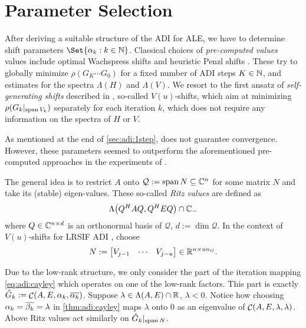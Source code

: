 \section{Parameter Selection}
\label{sec:adi:parameters}

After deriving a suitable structure of the \ac{ADI} for \ac{ALE},
we have to determine shift parameters $\Set{\alpha_k : k\in\N}$.
Classical choices of \emph{pre-computed values} values include
optimal Wachspress shifts \cite{Wachspress1992,Wachspress2013} and
heuristic Penzl shifts \cite{Penzl1999}.
These try to globally minimize $\rho(G_K \cdots G_0)$ for a fixed number of \ac{ADI} steps $K\in\mathbb{N}$,
and estimates for the spectra $\Lambda(H)$ and $\Lambda(V)$.
We resort to the first ansatz of \emph{self-generating shifts} described in \cite[Section~5.3]{Kuerschner2016},
so-called $V(u)$-shifts,
which aim at minimizing
$\rho(G_k |_{\operatorname{span} V_k})$
separately for each iteration $k$,
which does not require any information on the spectra of $H$ or $V$.

As mentioned at the end of \autoref{sec:adi:1step},
does not guarantee convergence.
However, these parameters seemed to outperform the aforementioned pre-computed approaches in the experiments of \cite{Kuerschner2016}.

The general idea is to restrict $A$ onto
$\mathcal Q := \operatorname{span} N \subseteq \mathbb{C}^n$
for some matrix $N$ and take its (stable) eigen-values.
These so-called \emph{Ritz values} are defined as
\begin{equation}
  \Lambda\big( Q^H A Q, Q^H E Q \big) \cap \mathbb{C}_-
\end{equation}
where $Q\in\mathbb{C}^{n\times d}$ is an orthonormal basis of $\mathcal Q$, $d := \dim\mathcal Q$.
In the context of $V(u)$-shifts for \ac{LRSIF} \ac{ADI} \cite{Lang2015}, choose
\begin{equation}
  N := \begin{bmatrix}
    V_{j-1} &
    \cdots &
    V_{j-u}
  \end{bmatrix}
  \in \mathbb{R}^{n\times u n_G}
  .
\end{equation}

\begin{remark}
  Due to the low-rank structure, we only consider the part of the iteration mapping \eqref{eq:adi:cayley}
  which operates on one of the low-rank factors.
  This part is exactly $\hat G_k := \Cayley(A, E, \alpha_k, \conj{\alpha_k})$.
  Suppose $\lambda \in \Lambda(A, E) \cap \mathbb{R}$, $\lambda < 0$.
  Notice how choosing $\alpha_k = \conj{\beta_k} = \lambda$ in \autoref{thm:adi:cayley}
  maps $\lambda$ onto $0$ as an eigenvalue of $\mathop{\mathcal{C}}(A, E, \lambda, \lambda)$.
  Above Ritz values act similarly on $\hat G_k |_{\operatorname{span} N}$.
\end{remark}

